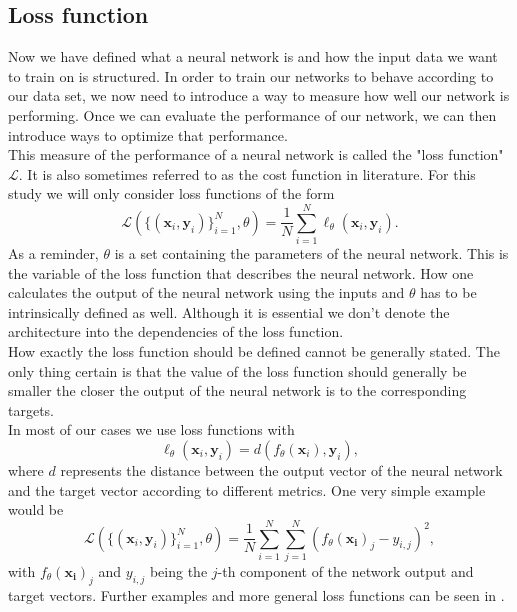 \subsection{Loss function}
Now we have defined what a neural network is and how the input data we want to train on is structured. In order to train our networks to behave according to our data set, we now need to introduce a way to measure how well our network is performing. Once we can evaluate the performance of our network, we can then introduce ways to optimize that performance.\\
This measure of the performance of a neural network is called the "loss function" $\mathscr{L}$. It is also sometimes referred to as the cost function in literature. For this study we will only consider loss functions of the form 
\begin{equation}\label{eq:Loss_longform}
	\mathscr{L}\left( \{(\mathbf{x}_i, \mathbf{y}_i)\}_{i=1}^{N}, \theta \right) = \frac{1}{N} \sum_{i=1}^{N} \ell_\theta\left(\mathbf{x}_i,\mathbf{y}_i\right).
\end{equation}
As a reminder, $\theta$ is a set containing the parameters of the neural network. This is the variable of the loss function that describes the neural network. How one calculates the output of the neural network using the inputs and $\theta$ has to be intrinsically defined as well. Although it is essential we don't denote the architecture into the dependencies of the loss function. \\
How exactly the loss function should be defined cannot be generally stated. The only thing certain is that the value of the loss function should generally be smaller the closer the output of the neural network is to the corresponding targets.\\
In most of our cases we use loss functions with 
\begin{equation}
	\ell_\theta \left( \mathbf{x}_i,\mathbf{y}_i\right) = 
	d\left(f_\theta(\mathbf{x}_i), \mathbf{y}_i\right),
\end{equation}
where $d$ represents the distance between the output vector of the neural network and the target vector according to different metrics. One very simple example would be 
\begin{equation}
	\mathscr{L}\left( \{(\mathbf{x}_i, \mathbf{y}_i)\}_{i=1}^{N}, \theta \right) = \frac{1}{N} \sum_{i=1}^{N} \sum_{j=1}^{N} \left(f_\theta(\mathbf{x_{i}})_j - y_{i,j}\right)^2,
\end{equation}
with $f_\theta(\mathbf{x_{i}})_j$ and $y_{i,j}$ being the $j$-th component of the network output and target vectors. Further examples and more general loss functions can be seen in \cite{LossExamplePaper}.

